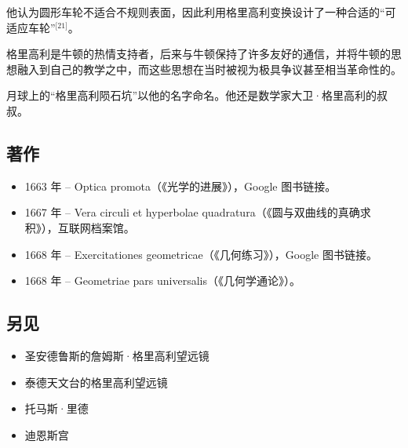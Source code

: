 他认为圆形车轮不适合不规则表面，因此利用格里高利变换设计了一种合适的“可适应车轮”\(^\text{[21]}\)。  

格里高利是牛顿的热情支持者，后来与牛顿保持了许多友好的通信，并将牛顿的思想融入到自己的教学之中，而这些思想在当时被视为极具争议甚至相当革命性的。  

月球上的“格里高利陨石坑”以他的名字命名。他还是数学家大卫·格里高利的叔叔。  
\subsection{著作}
\begin{itemize}
\item 1663 年 – Optica promota（《光学的进展》），Google 图书链接。
\item 1667 年 – Vera circuli et hyperbolae quadratura（《圆与双曲线的真确求积》），互联网档案馆。
\item 1668 年 – Exercitationes geometricae（《几何练习》），Google 图书链接。
\item 1668 年 – Geometriae pars universalis（《几何学通论》）。
\end{itemize}
\subsection{另见}
\begin{itemize}
\item 圣安德鲁斯的詹姆斯·格里高利望远镜
\item 泰德天文台的格里高利望远镜
\item 托马斯·里德
\item 迪恩斯宫
\end{itemize}
